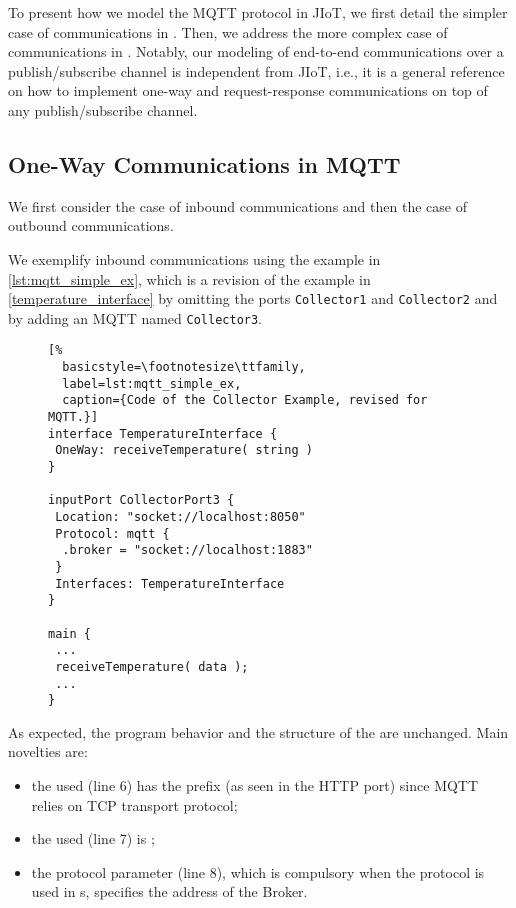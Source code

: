 To present how we model the MQTT protocol in JIoT, we first detail the simpler
case of  communications in . Then, we
address the more complex case of  communications in
. Notably, our modeling of end-to-end communications over
a publish/subscribe channel is independent from JIoT, i.e., it is a general
reference on how to implement one-way and request-response communications on
top of any publish/subscribe channel.

\subsection{One-Way Communications in MQTT}
\label{sub:ow_in_mqtt}

We first consider the case of inbound communications and then the case of
outbound communications.

We exemplify  inbound communications using the example in
\cref{lst:mqtt_simple_ex}, which is a revision of the example in
\cref{temperature_interface} by omitting the ports 
\texttt{Collector1} and \texttt{Collector2} and 
by adding an MQTT  named \texttt{Collector3}.

\begin{figure}[t]
\begin{lstlisting}[%
  basicstyle=\footnotesize\ttfamily,
  label=lst:mqtt_simple_ex, 
  caption={Code of the Collector Example, revised for MQTT.}]
interface TemperatureInterface {
 OneWay: receiveTemperature( string )
}

inputPort CollectorPort3 {
 Location: "socket://localhost:8050"
 Protocol: mqtt {
  .broker = "socket://localhost:1883"
 }
 Interfaces: TemperatureInterface
}

main {
 ...
 receiveTemperature( data );
 ...
}
\end{lstlisting}
\end{figure}

As expected, the program behavior and the structure of the 
are unchanged. Main novelties are:
%
\begin{itemize}
  \item the used  (line 6) has the prefix 
   (as seen in the HTTP port) since MQTT relies on TCP
  transport protocol;
  \item the used  (line 7) is ;
  \item the  protocol parameter (line 8), which is
  compulsory when the  protocol is used in s,
  specifies the address of the Broker.
\end{itemize}


